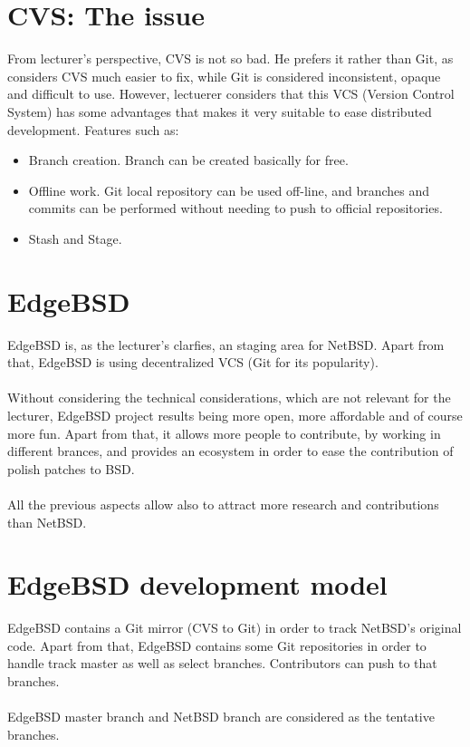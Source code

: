 \documentclass[11pt]{article}
\begin{document}
\section{CVS: The issue}
From lecturer's perspective, CVS is not so bad. He prefers it rather than Git, as considers CVS much easier to fix, while Git is considered inconsistent, opaque and difficult to use. However, lectuerer considers that this VCS (Version Control System) has some advantages that makes it very suitable to ease distributed development. Features such as:
\begin{itemize}
\item{Branch creation}. Branch can be created basically for free. 
\item{Offline work}. Git local repository can be used off-line, and branches and commits can be performed without needing to push to official repositories.
\item{Stash and Stage}.
\end{itemize}

\section{EdgeBSD}
EdgeBSD is, as the lecturer's clarfies, an staging area for NetBSD. Apart from that, EdgeBSD is using decentralized VCS (Git for its popularity).\\
\\
Without considering the technical considerations, which are not relevant for the lecturer, EdgeBSD project results being more open, more affordable and of course more fun. Apart from that, it allows more people to contribute, by working in different brances, and provides an ecosystem in order to ease the contribution of polish patches to BSD.\\
\\
All the previous aspects allow also to attract more research and contributions than NetBSD.

\section{EdgeBSD development model}
EdgeBSD contains a Git mirror (CVS to Git) in order to track NetBSD's original code. Apart from that, EdgeBSD contains some Git repositories in order to handle track master as well as select branches. Contributors can push to that branches.\\
\\
EdgeBSD master branch and NetBSD branch are considered as the tentative branches. 
\end{document}

